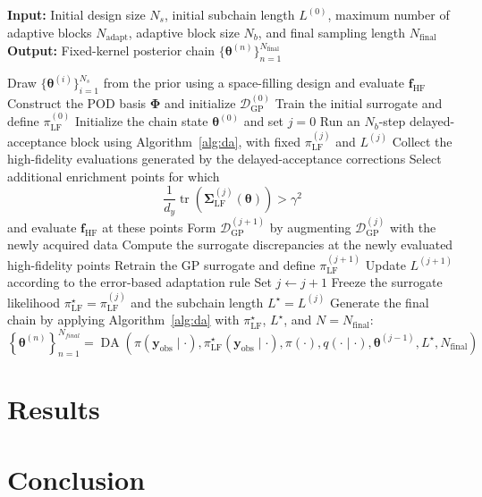 \documentclass{elsarticle}
\begin{document}
\begin{algorithm}[t]
\caption{Adaptive delayed-acceptance sampling scheme}
\label{alg:adaptive_da}
\begin{algorithmic}[1]
\Statex \textbf{Input:} Initial design size $N_s$, initial subchain length $L^{(0)}$,
maximum number of adaptive blocks $N_{\mathrm{adapt}}$, adaptive block size
$N_b$, and final sampling length $N_{\mathrm{final}}$
\Statex \textbf{Output:} Fixed-kernel posterior chain
$\{\boldsymbol{\theta}^{(n)}\}_{n=1}^{N_{\mathrm{final}}}$
\Statex
{}

\State Draw $\{\boldsymbol{\theta}^{(i)}\}_{i=1}^{N_s}$ from the prior using
a space-filling design and evaluate $\mathbf f_{\mathrm{HF}}$
\State Construct the POD basis $\mathbf\Phi$ and initialize
$\mathcal D_{\mathrm{GP}}^{(0)}$
\State Train the initial surrogate and define
$\pi_{\mathrm{LF}}^{(0)}$
\Statex
{}
\State Initialize the chain state $\boldsymbol{\theta}^{(0)}$ and set $j=0$
    \State Run an $N_b$-step delayed-acceptance block using
    Algorithm~\ref{alg:da}, with fixed
    $\pi_{\mathrm{LF}}^{(j)}$ and $L^{(j)}$
    \State Collect the high-fidelity evaluations generated by the
    delayed-acceptance corrections
    \State Select additional enrichment points for which
    \[
        \frac{1}{d_y}
        \operatorname{tr}
        \!\left(
        \mathbf\Sigma_{\mathrm{LF}}^{(j)}
        (\boldsymbol{\theta})
        \right)
        > \gamma^2
    \]
    and evaluate $\mathbf f_{\mathrm{HF}}$ at these points
    \State Form $\mathcal D_{\mathrm{GP}}^{(j+1)}$ by augmenting
    $\mathcal D_{\mathrm{GP}}^{(j)}$ with the newly acquired data
    \State Compute the surrogate discrepancies at the newly evaluated
    high-fidelity points
    \State Retrain the GP surrogate and define
    $\pi_{\mathrm{LF}}^{(j+1)}$
    \State Update $L^{(j+1)}$ according to the error-based adaptation rule
    \State Set $j\gets j+1$
\EndWhile
\Statex
{}
\State Freeze the surrogate likelihood
$\pi_{\mathrm{LF}}^\star=\pi_{\mathrm{LF}}^{(j)}$
and the subchain length $L^\star=L^{(j)}$
\State Generate the final chain by applying Algorithm~\ref{alg:da} with
$\pi_{\mathrm{LF}}^\star$, $L^\star$, and
$N=N_{\mathrm{final}}$:
    \begin{equation*}
        \left\{
        \boldsymbol{\theta}^{(n)}
        \right\}_{n=1}^{N_{final}}
        =
        \operatorname{DA}\!\left(
        \pi(\mathbf y_{\mathrm{obs}}\mid\cdot),
        \pi_{\mathrm{LF}}^{\star}(\mathbf y_{\mathrm{obs}}\mid\cdot),
        \pi(\cdot),
        q(\cdot\mid\cdot),
        \boldsymbol{\theta}^{(j-1)},
        L^\star,
        N_{\text{final}}
        \right)
    \end{equation*}
\end{algorithmic}
\end{algorithm}

\section{Results}\label{sec:numerics}
\section{Conclusion}\label{sec:conclusion}




\end{document}
